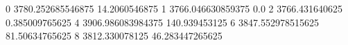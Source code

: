 0 3780.252685546875 14.2060546875
1 3766.046630859375 0.0
2 3766.431640625 0.385009765625
4 3906.986083984375 140.939453125
6 3847.552978515625 81.50634765625
8 3812.330078125 46.283447265625
